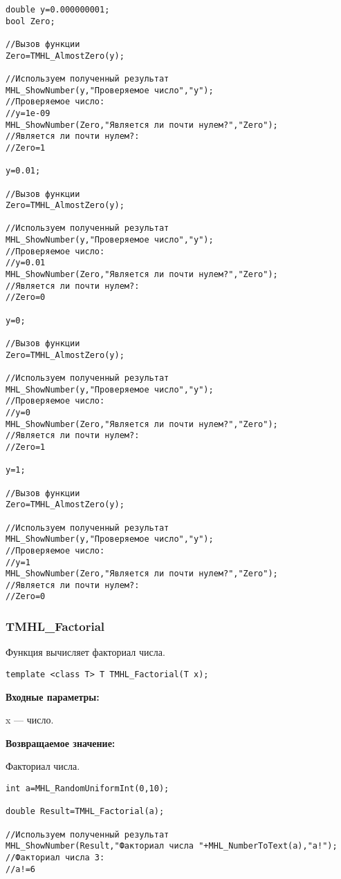 \documentclass[a4paper,12pt]{article}
\begin{document}
\begin{lstlisting}[label=code_use_TMHL_AlmostZero,caption=Пример использования]
double y=0.000000001;
bool Zero;

//Вызов функции
Zero=TMHL_AlmostZero(y);

//Используем полученный результат
MHL_ShowNumber(y,"Проверяемое число","y");
//Проверяемое число:
//y=1e-09
MHL_ShowNumber(Zero,"Является ли почти нулем?","Zero");
//Является ли почти нулем?:
//Zero=1

y=0.01;

//Вызов функции
Zero=TMHL_AlmostZero(y);

//Используем полученный результат
MHL_ShowNumber(y,"Проверяемое число","y");
//Проверяемое число:
//y=0.01
MHL_ShowNumber(Zero,"Является ли почти нулем?","Zero");
//Является ли почти нулем?:
//Zero=0

y=0;

//Вызов функции
Zero=TMHL_AlmostZero(y);

//Используем полученный результат
MHL_ShowNumber(y,"Проверяемое число","y");
//Проверяемое число:
//y=0
MHL_ShowNumber(Zero,"Является ли почти нулем?","Zero");
//Является ли почти нулем?:
//Zero=1

y=1;

//Вызов функции
Zero=TMHL_AlmostZero(y);

//Используем полученный результат
MHL_ShowNumber(y,"Проверяемое число","y");
//Проверяемое число:
//y=1
MHL_ShowNumber(Zero,"Является ли почти нулем?","Zero");
//Является ли почти нулем?:
//Zero=0
\end{lstlisting}

\subsubsection{TMHL\_Factorial}\label{TMHL_Factorial}

Функция вычисляет факториал числа.


\begin{lstlisting}[label=code_syntax_TMHL_Factorial,caption=Синтаксис]
template <class T> T TMHL_Factorial(T x);
\end{lstlisting}

\textbf{Входные параметры:}  
 
 x --- число.

\textbf{Возвращаемое значение:}

 Факториал числа.


\begin{lstlisting}[label=code_use_TMHL_Factorial,caption=Пример использования]
int a=MHL_RandomUniformInt(0,10);

double Result=TMHL_Factorial(a);

//Используем полученный результат
MHL_ShowNumber(Result,"Факториал числа "+MHL_NumberToText(a),"a!");
//Факториал числа 3:
//a!=6
\end{lstlisting}
\end{document}
